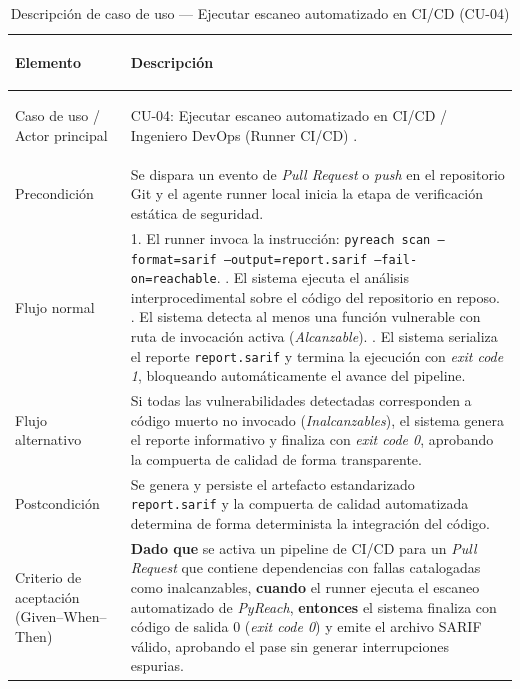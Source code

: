 \begin{table}[H]
\centering
\caption{Descripción de caso de uso — Ejecutar escaneo automatizado en CI/CD (CU-04)}
\label{tab:cu04_desarrollo}
\small
{}
\begin{tabularx}{\textwidth}{>{\bfseries\raggedright\arraybackslash}p{4.2cm} X}
\toprule
\textbf{Elemento} & \textbf{Descripción} \\
\midrule
Caso de uso / Actor principal & CU-04: Ejecutar escaneo automatizado en CI/CD / Ingeniero DevOps (Runner CI/CD) \parencite{humble2010continuous}. \\ %
\addlinespace
Precondición & Se dispara un evento de \textit{Pull Request} o \textit{push} en el repositorio Git y el agente runner local inicia la etapa de verificación estática de seguridad. \\ %
\addlinespace
Flujo normal & 
1. El runner invoca la instrucción: \texttt{pyreach scan --format=sarif --output=report.sarif --fail-on=reachable}. \newline
2. El sistema ejecuta el análisis interprocedimental sobre el código del repositorio en reposo. \newline
3. El sistema detecta al menos una función vulnerable con ruta de invocación activa (\textit{Alcanzable}). \newline
4. El sistema serializa el reporte \texttt{report.sarif} y termina la ejecución con \textit{exit code 1}, bloqueando automáticamente el avance del pipeline. \\ %
\addlinespace
Flujo alternativo & Si todas las vulnerabilidades detectadas corresponden a código muerto no invocado (\textit{Inalcanzables}), el sistema genera el reporte informativo y finaliza con \textit{exit code 0}, aprobando la compuerta de calidad de forma transparente. \\ %
\addlinespace
Postcondición & Se genera y persiste el artefacto estandarizado \texttt{report.sarif} y la compuerta de calidad automatizada determina de forma determinista la integración del código. \\ %
\addlinespace
Criterio de aceptación (Given--When--Then) & 
\textbf{Dado que} se activa un pipeline de CI/CD para un \textit{Pull Request} que contiene dependencias con fallas catalogadas como inalcanzables, \newline
\textbf{cuando} el runner ejecuta el escaneo automatizado de \textit{PyReach}, \newline
\textbf{entonces} el sistema finaliza con código de salida 0 (\textit{exit code 0}) y emite el archivo SARIF válido, aprobando el pase sin generar interrupciones espurias. \\ %
\bottomrule
\end{tabularx}
\end{table}

